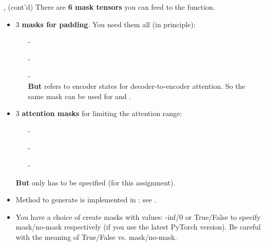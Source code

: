 \begin{frame}[fragile]{,  (cont'd)}
There are \textbf{6 mask tensors} you can feed to the  function.
\begin{itemize}
\item 3 \textbf{masks for padding}. You need them all (in principle):
\begin{itemize}
\item[-] 
\item[-] 
\item[-] \\
\textbf{But}  refers to encoder states for decoder-to-encoder attention.
So the same mask can be used for  and .
\end{itemize}
\item 3 \textbf{attention masks} for limiting the attention range:
\begin{itemize}
\item[-] 
\item[-] 
\item[-] \\
\end{itemize}
\textbf{But} only  has to be specified (for this assignment).
\item Method to generate  is implemented in : see .
\item You have a choice of create masks with values: -inf/0 or True/False to specify mask/no-mask respectively (if you use the latest PyTorch version). \alert{Be careful with the meaning of True/False vs. mask/no-mask}.
\end{itemize}
\end{frame}

